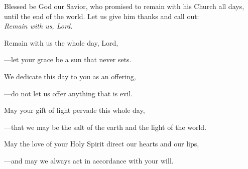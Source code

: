 \intercessions\indent

\begin{hangpar}

Blessed be God our Savior, who promised to remain with his Church all days, until the end of the world. Let us give him thanks and call out:\\
\emph{Remain with us, Lord.}

\medskip Remain with us the whole day, Lord,

{\color{red}---\thinspace}let your grace be a sun that never sets.

\medskip We dedicate this day to you as an offering,

{\color{red}---\thinspace}do not let us offer anything that is evil.

\medskip May your gift of light pervade this whole day,

{\color{red}---\thinspace}that we may be the salt of the earth and the light of the world.

\medskip May the love of your Holy Spirit direct our hearts and our lips,

{\color{red}---\thinspace}and may we always act in accordance with your will.

\end{hangpar}

